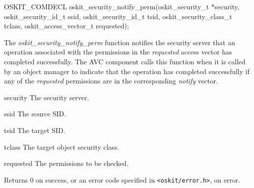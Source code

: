 \begin{apisyn}

	\funcproto OSKIT_COMDECL
	oskit_security_notify_perm(oskit_security_t *security, 
		          oskit_security_id_t ssid,
			  oskit_security_id_t tsid,
                          oskit_security_class_t tclass,
			  oskit_access_vector_t requested);
\end{apisyn}
\begin{apidesc}

The \emph{oskit\_security\_notify\_perm} function notifies the security
server that an operation associated with the permissions in the 
\emph{requested} access vector has completed successfully.
The AVC component calls this function when it is called by an object
manager to indicate that the operation has completed successfully if
any of the \emph{requested} permissions are in the corresponding
\emph{notify} vector.

\end{apidesc}
\begin{apiparm}
	\item[security]
		The security server.
	\item[ssid]
		The source SID.
	\item[tsid]
		The target SID.
	\item[tclass]
		The target object security class.
	\item[requested]
		The permissions to be checked.
\end{apiparm}
\begin{apiret}
	Returns 0 on success, or an error code specified in
	{\tt <oskit/error.h>}, on error.
\end{apiret}

